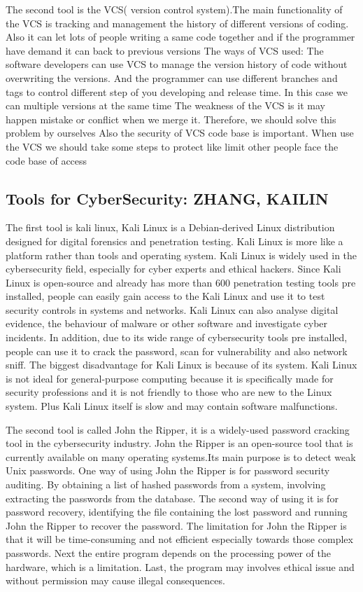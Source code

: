\documentclass[a4paper, 11pt]{report}
\begin{document}
The second tool is the VCS( version control system).The main functionality of the VCS is tracking and management the history of different versions of coding. Also it can let lots of people writing a same code together and if the programmer have demand it can back to previous versions
The ways of VCS used:
The software developers can use VCS to manage the version history of code without overwriting the versions. And the programmer can use different branches and tags to control different step of you developing and release time. In this case we can multiple versions at the same time
The weakness of the VCS is it may happen mistake or conflict when we merge it. Therefore, we should solve this problem by ourselves Also the security of VCS code base is important. When use the VCS we should take some steps to protect like limit other people face the code base of access

\subsection{Tools for CyberSecurity: ZHANG, KAILIN }
The first tool is kali linux, Kali Linux is a Debian-derived Linux distribution designed for digital forensics and penetration testing. Kali Linux is more like a platform rather than tools and operating system. Kali Linux is widely used in the cybersecurity field, especially for cyber experts and ethical hackers.
Since Kali Linux is open-source and already has more than 600 penetration testing tools pre installed, people can easily gain access to the Kali Linux and use it to test security controls in systems and networks. Kali Linux can also analyse digital evidence, the behaviour of malware or other software and investigate cyber incidents. In addition, due to its wide range of cybersecurity tools pre installed, people can use it to crack the password, scan for vulnerability and also network sniff.
The biggest disadvantage for Kali Linux is because of its system. Kali Linux is not ideal for general-purpose computing because it is specifically made for security professions and it is not friendly to those who are new to the Linux system. Plus Kali Linux itself is slow and may contain software malfunctions.

The second tool is called John the Ripper, it is a widely-used password cracking tool in the cybersecurity industry. John the Ripper is an open-source tool that is currently available on many operating systems.Its main purpose is to detect weak Unix passwords.
One way of using John the Ripper is for password security auditing. By obtaining a list of hashed passwords from a system, involving extracting the passwords from the database. The second way of using it is for password recovery, identifying the file containing the lost password and running John the Ripper to recover the password.
The limitation for John the Ripper is that it will be time-consuming and not efficient especially towards those complex passwords. Next the entire program depends on the processing power of the hardware, which is a limitation. Last, the program may involves ethical issue and without permission may cause illegal consequences.
\end{document}
